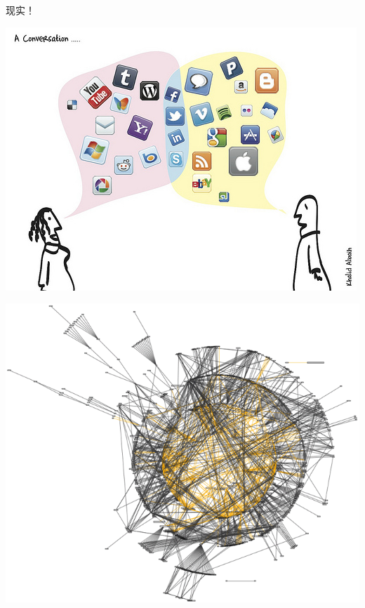 \documentclass{beamer}
\begin{document}
\begin{frame}[plain]
	现实！\\
	\begin{center}
	\includegraphics[width=\textwidth]{images/web-communication.jpg}
	\end{center}
\end{frame}

\begin{frame}[plain]
	\begin{center}
	\includegraphics[width=\textwidth]{images/real-web-interaction.png}
	\end{center}
\end{frame}
\end{document}
